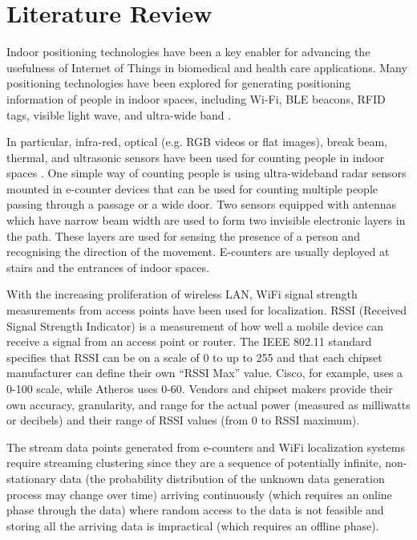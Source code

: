 \setlength{\parindent}{2em}
% 
\chapter{Literature Review}

Indoor positioning technologies have been a key enabler for advancing the usefulness of Internet of Things in biomedical and health care applications. Many positioning technologies have been explored for generating positioning information of people in indoor spaces, including Wi-Fi, BLE beacons, RFID tags, visible light wave, and ultra-wide band \cite{namiot2015indoor, jeon2018ble}. 

In particular, infra-red, optical (e.g. RGB videos or flat images), break beam, thermal, and ultrasonic sensors have been used for counting people in indoor spaces \cite{mautz2012indoor}. One simple way of counting people is using ultra-wideband radar sensors mounted in e-counter devices that can be used for counting multiple people passing through a passage or a wide door. Two sensors equipped with antennas which have narrow beam width are used to form two invisible electronic layers in the path. These layers are used for sensing the presence of a person and recognising the direction of the movement.  E-counters are usually deployed at stairs and the entrances of indoor spaces. 

With the increasing proliferation of wireless LAN, WiFi signal strength measurements from access points have been used for localization. RSSI (Received Signal Strength Indicator) is a measurement of how well a mobile device can receive a signal from an access point or router. The IEEE 802.11 standard specifies that RSSI can be on a scale of 0 to up to 255 and that each chipset manufacturer can define their own “RSSI Max” value. Cisco, for example, uses a 0-100 scale, while Atheros uses 0-60. Vendors and chipset makers provide their own accuracy, granularity, and range for the actual power (measured as milliwatts or decibels) and their range of RSSI values (from 0 to RSSI maximum). 

The stream data points generated from e-counters and WiFi localization systems require streaming clustering since they are a sequence of potentially infinite, non-stationary data (the probability distribution of the unknown data generation process may change over time) arriving continuously (which requires an online phase through the data) where random access to the data is not feasible and storing all the arriving data is impractical (which requires an offline phase). 




